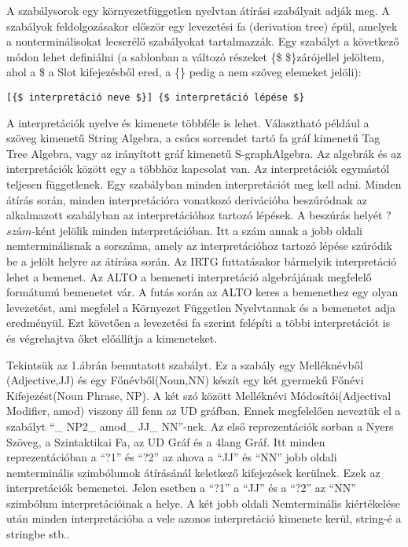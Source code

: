 A szabálysorok egy környezetfüggetlen nyelvtan átírási szabályait adják meg. A szabályok feldolgozásakor először egy levezetési fa (derivation tree) épül, amelyek a nonterminálisokat lecserélő szabályokat tartalmazzák. Egy szabályt a következő módon lehet definiálni (a sablonban a változó részeket \{\$ \$\}zárójellel jelöltem, ahol a \$ a Slot kifejezésből ered, a \{\} pedig a nem szöveg elemeket jelöli):
\begin{verbatim}
[{$ interpretáció neve $}] {$ interpretáció lépése $}
\end{verbatim}
A interpretációk nyelve és kimenete többféle is lehet.  Választható például a szöveg kimenetű String Algebra, a csúcs sorrendet tartó fa gráf kimenetű Tag Tree Algebra, vagy  az irányított gráf kimenetű S-graphAlgebra. Az algebrák és az interpretációk között egy a többhöz kapcsolat van. Az interpretációk egymástól teljesen függetlenek. Egy szabályban minden interpretációt meg kell adni. Minden átírás során, minden interpretációra vonatkozó derivációba beszúródnak az alkalmazott szabályban az interpretációhoz tartozó lépések. A beszúrás helyét ?{$  szám $}-ként jelölik minden interpretációban. Itt a szám annak a jobb oldali nemterminálisnak a sorszáma, amely az interpretációhoz tartozó lépése szúródik be a jelölt helyre az átírása során. Az IRTG futtatásakor bármelyik interpretáció lehet a bemenet. Az ALTO a bemeneti interpretáció algebrájának megfelelő formátumú bemenetet vár. A futás során az ALTO keres a bemenethez egy olyan levezetést, ami megfelel a Környezet Független Nyelvtannak és a bemenetet adja eredményül. Ezt követően a levezetési fa szerint felépíti a többi interpretációt is és végrehajtva őket előállítja a kimeneteket.

Tekintsük az 1.ábrán bemutatott szabályt. Ez a szabály egy Melléknévből (Adjective,JJ) és egy Főnévből(Noun,NN) készít egy két gyermekű Főnévi Kifejezést(Noun Phrase, NP). A két szó között Melléknévi Módosítói(Adjectival Modifier, amod) viszony áll fenn az UD gráfban. Ennek megfelelően neveztük el a szabályt “\_ NP2\_ amod\_ JJ\_ NN”-nek. Az első reprezentációk sorban a Nyers Szöveg, a Szintaktikai Fa, az UD Gráf és a 4lang Gráf.
Itt minden reprezentációban a “?1” és “?2” az ahova a “JJ” és “NN” jobb oldali nemterminális szimbólumok átírásánál keletkező kifejezések kerülnek. Ezek az interpretációk bemenetei. Jelen esetben a “?1” a “JJ” és a “?2” az “NN” szimbólum interpretációinak a helye. A két jobb oldali Nemterminális kiértékelése után minden interpretációba a vele azonos interpretáció kimenete kerül, string-é a stringbe stb..

